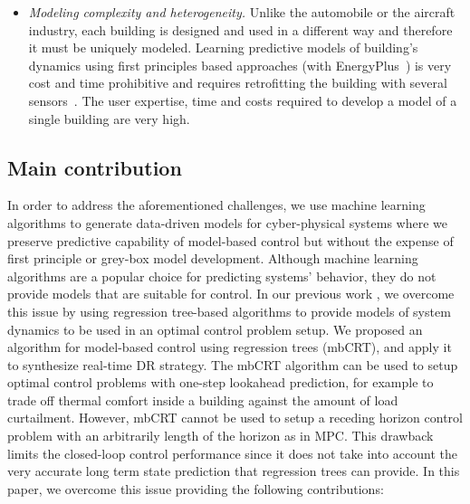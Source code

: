 \begin{itemize}[leftmargin=0.5cm]
\item \emph{Modeling complexity and heterogeneity.} Unlike the automobile or the aircraft industry, each building is designed and used in a different way and therefore it must be uniquely modeled. Learning predictive models of building's dynamics using first principles based approaches (\eg with EnergyPlus~\cite{Crawley2001319}) is very cost and time prohibitive and requires retrofitting the building with several sensors~\cite{costmpc}. The user expertise, time and costs required to develop a model of a single building are very high.
\end{itemize}

\subsection{Main contribution}

In order to address the aforementioned challenges, we use machine learning algorithms to generate data-driven models for cyber-physical systems where we preserve predictive capability of model-based control but without the expense of first principle or grey-box model development.
Although machine learning algorithms are a popular choice for predicting systems' behavior, they do not provide models that are suitable for control.
In our previous work \cite{BehlJainMangharam2016,Behl201630}, we overcome this issue by using regression tree-based algorithms to provide models of system dynamics to be used in an optimal control problem setup.
We proposed an algorithm for model-based control using regression trees (mbCRT), and apply it to synthesize real-time DR strategy.
The mbCRT algorithm can be used to setup optimal control problems with one-step lookahead prediction, for example to trade off thermal comfort inside a building against the amount of load curtailment.
However, mbCRT cannot be used to setup a receding horizon control problem with an arbitrarily length of the horizon as in MPC. 
This drawback limits the closed-loop control performance since it does not take into account the very accurate long term state prediction that regression trees can provide. 
In this paper, we overcome this issue providing the following contributions:

